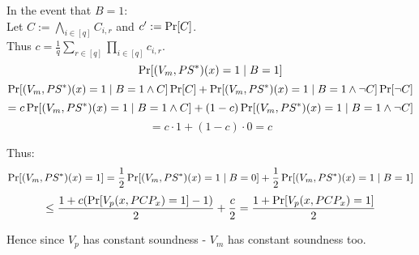 \begin{itemize}
		In the event that $B=1$:\\
		Let $C:=\bigwedge_{i\in[q]}C_{i,r}$ and $c':=\operatorname*{Pr}[C]$.\\
		Thus $c=\frac{1}{q}\sum_{r\in[q]}\prod_{i\in[q]}c_{i,r}$.\\
		\[
			\operatorname*{Pr}[(V_m,PS^*)(x)=1\mid B=1]
		\]
		\[
			\operatorname*{Pr}[(V_m,PS^*)(x)=1\mid B=1\wedge C]\operatorname*{Pr}[C]
			+\operatorname*{Pr}[(V_m,PS^*)(x)=1\mid B=1\wedge \neg C]\operatorname*{Pr}[\neg C]
		\]
		\[
			=c\operatorname*{Pr}[(V_m,PS^*)(x)=1\mid B=1\wedge C]
			+(1-c)\operatorname*{Pr}[(V_m,PS^*)(x)=1\mid B=1\wedge \neg C]
		\]
		\[
			=c\cdot 1+(1-c)\cdot 0=c
		\]

		Thus:
		\[
			\operatorname*{Pr}[(V_m,PS^*)(x)=1]
			=\frac{1}{2}\operatorname*{Pr}[(V_m,PS^*)(x)=1\mid B=0]+\frac{1}{2}\operatorname*{Pr}[(V_m,PS^*)(x)=1\mid B=1]
		\]
		\[
			\leq \frac{1+c(\operatorname*{Pr}[V_p(x, PCP_x)=1]-1)}{2}+\frac{c}{2}=\frac{1+\operatorname*{Pr}[V_p(x, PCP_x)=1]}{2}
		\]

		Hence since $V_p$ has constant soundness - $V_m$ has constant soundness too.
\end{itemize}
